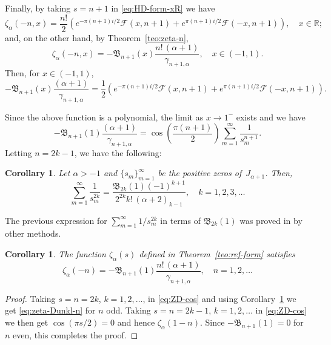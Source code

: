 \documentclass[a4paper]{amsart}
\newcommand{\R}{\mathbb{R}}
\newcommand{\B}{\mathfrak{B}}
\theoremstyle{plain}
\newtheorem{corollary}[theorem]{Corollary}
\theoremstyle{definition}
\theoremstyle{remark}
\numberwithin{equation}{section}
\begin{document}
Finally, by taking $s=n+1$ in \eqref{eq:HD-form-xR} we have
\begin{equation*}
\zeta_{\alpha}(-n,x) = \frac{n!}{2}
\left(e^{-\pi (n+1) i/2} \mathcal{F}(x,n+1) + e^{\pi (n+1) i/2} \mathcal{F}(-x,n+1)\right),
\quad x \in \R;
\end{equation*}
and, on the other hand, by Theorem~\ref{teo:zeta-n}, 
\begin{equation*}
\zeta_{\alpha}(-n,x) = -\B_{n+1}(x)\frac{n!\,(\alpha+1)}{\gamma_{n+1,\alpha}}, \quad x \in (-1,1).
\end{equation*}
Then, for $x \in (-1,1)$,
\[
-\B_{n+1}(x)\frac{(\alpha+1)}{\gamma_{n+1,\alpha}}
= \frac{1}{2}
\left(e^{-\pi (n+1) i/2} \mathcal{F}(x,n+1) + e^{\pi (n+1) i/2} \mathcal{F}(-x,n+1)\right).
\]

Since the above function is a polynomial, the limit as $x\to 1^{-}$ exists and we have
\[
-\B_{n+1}(1)\frac{(\alpha+1)}{\gamma_{n+1,\alpha}}  = \cos{\left(\frac{\pi (n+1)}{2}\right)} 
   \sum_{m=1}^{\infty} \frac{1}{s_m^{n+1}}.
\]
Letting $n=2k-1$, we have the following:

\begin{corollary}
\label{cor:sum-sm}
Let $\alpha>-1$ and $\{s_m\}_{m=1}^{\infty}$ be the positive zeros of~$J_{\alpha+1}$.
Then,
\begin{equation*}
\sum_{m=1}^{\infty} \frac{1}{s_m^{2k}} 
= \frac{\B_{2k}(1)(-1)^{k+1}}{2^{2k}k!\,(\alpha+2)_{k-1}},
\quad k=1,2,3,\dots
\end{equation*}
\end{corollary}

The previous expression for $\sum_{m=1}^{\infty} {1}/s_m^{2k}$ in terms of $\B_{2k}(1)$ was proved in \cite[Theorem 4.1]{CDPV} by other methods. 

\begin{corollary}
The function $\zeta_{\alpha}(s)$ defined in Theorem~\ref{teo:ref-form} satisfies
\begin{equation}
\label{eq:zeta-Dunkl-n}
\zeta_\alpha(-n) = -\B_{n+1}(1)\frac{n!\,(\alpha+1)}{\gamma_{n+1,\alpha}},
\quad n=1,2,\dots
\end{equation}
\end{corollary}

\begin{proof}
Taking $s=n=2k$, $k=1,2,\dots$, in \eqref{eq:ZD-cos} and using Corollary~\ref{cor:sum-sm} we get \eqref{eq:zeta-Dunkl-n} for $n$ odd. Taking $s=n=2k-1$, $k=1,2,\dots$ in \eqref{eq:ZD-cos} we then get $\cos{(\pi s/2)}=0$ and hence $\zeta_\alpha(1-n)$. Since $-\B_{n+1}(1)=0$ for $n$ even, this completes the proof. 
\end{proof}
\end{document}

